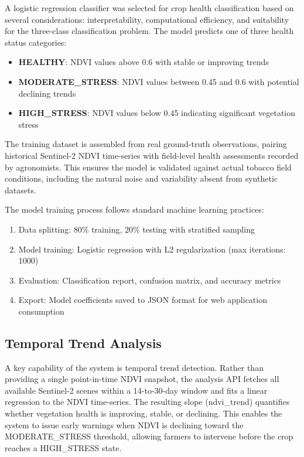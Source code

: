 \documentclass[journal]{IEEEtran}
\begin{document}
A logistic regression classifier was selected for crop health classification based on several considerations: interpretability, computational efficiency, and suitability for the three-class classification problem. The model predicts one of three health status categories:

\begin{itemize}
\item \textbf{HEALTHY}: NDVI values above 0.6 with stable or improving trends
\item \textbf{MODERATE\_STRESS}: NDVI values between 0.45 and 0.6 with potential declining trends
\item \textbf{HIGH\_STRESS}: NDVI values below 0.45 indicating significant vegetation stress
\end{itemize}

The training dataset is assembled from real ground-truth observations, pairing historical Sentinel-2 NDVI time-series with field-level health assessments recorded by agronomists. This ensures the model is validated against actual tobacco field conditions, including the natural noise and variability absent from synthetic datasets.

The model training process follows standard machine learning practices:

\begin{enumerate}
\item Data splitting: 80\% training, 20\% testing with stratified sampling
\item Model training: Logistic regression with L2 regularization (max iterations: 1000)
\item Evaluation: Classification report, confusion matrix, and accuracy metrics
\item Export: Model coefficients saved to JSON format for web application consumption
\end{enumerate}

\subsection{Temporal Trend Analysis}

A key capability of the system is temporal trend detection. Rather than providing a single point-in-time NDVI snapshot, the analysis API fetches all available Sentinel-2 scenes within a 14-to-30-day window and fits a linear regression to the NDVI time-series. The resulting slope (ndvi\_trend) quantifies whether vegetation health is improving, stable, or declining. This enables the system to issue early warnings when NDVI is declining toward the MODERATE\_STRESS threshold, allowing farmers to intervene before the crop reaches a HIGH\_STRESS state.
\end{document}
